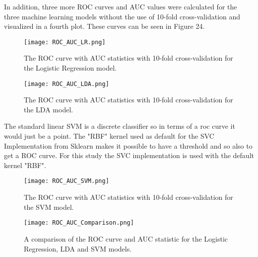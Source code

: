 \documentclass[../masterarbeit.tex]{subfiles}
\begin{document}
In addition, three more ROC curves and AUC values were calculated for the three machine learning models without the use of 10-fold cross-validation and visualized in a fourth plot. These curves can be seen in Figure 24.






\begin{figure}[h]
    \centering
    \texttt{[image: ROC\_AUC\_LR.png]}
    \caption{The ROC curve with AUC statistics with 10-fold cross-validation for the Logistic Regression model.}
\end{figure}




\begin{figure}[h]
    \centering
    \texttt{[image: ROC\_AUC\_LDA.png]}
    \caption{The ROC curve with AUC statistics with 10-fold cross-validation for the LDA model.}
\end{figure}


The standard linear SVM is a discrete classifier so in terms of a roc curve it would just be a point.
The "RBF" kernel used as default for the SVC Implementation from Sklearn makes it possible to have a threshold and so also to get a ROC curve. For this study the SVC implementation is used with the default kernel "RBF". 


\begin{figure}[h]
    \centering
    \texttt{[image: ROC\_AUC\_SVM.png]}
    \caption{The ROC curve with AUC statistics with 10-fold cross-validation for the SVM model.}
\end{figure}





\begin{figure}[h]
    \centering
    \texttt{[image: ROC\_AUC\_Comparison.png]}
    \caption{A comparison of the ROC curve and AUC statistic for the Logistic Regression, LDA and SVM models.}
\end{figure}
\end{document}
